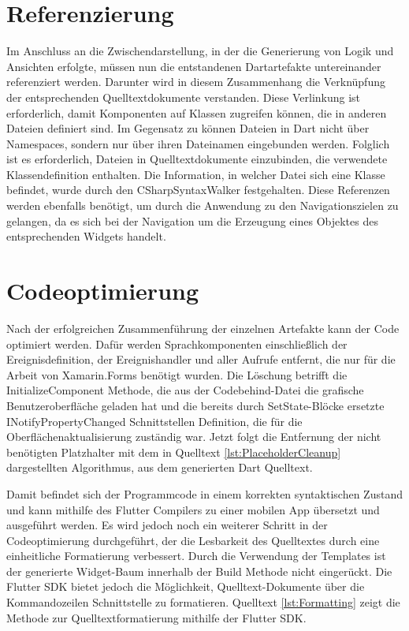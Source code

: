 \section{Referenzierung}
Im Anschluss an die Zwischendarstellung, in der die Generierung von Logik und Ansichten erfolgte,  müssen nun die entstandenen Dartartefakte untereinander referenziert werden.  Darunter wird in diesem Zusammenhang die Verknüpfung der entsprechenden Quelltextdokumente verstanden.  Diese Verlinkung ist erforderlich,  damit Komponenten auf Klassen zugreifen können,  die in anderen Dateien definiert sind.  Im Gegensatz zu \Csharp{} können Dateien in Dart nicht über Namespaces, sondern nur über ihren Dateinamen eingebunden werden.  Folglich ist es erforderlich,  Dateien in Quelltextdokumente einzubinden,  die verwendete Klassendefinition enthalten.  Die Information,  in welcher Datei sich eine Klasse befindet, wurde durch den \glq CSharpSyntaxWalker\grq{} festgehalten.  Diese Referenzen werden ebenfalls benötigt,  um durch die Anwendung zu den Navigationszielen zu gelangen, da es sich bei der Navigation um die Erzeugung eines Objektes des entsprechenden Widgets handelt. 


\section{Codeoptimierung}

Nach der erfolgreichen Zusammenführung der einzelnen Artefakte kann der Code optimiert werden. Dafür werden Sprachkomponenten einschließlich der Ereignisdefinition,  der Ereignishandler und aller Aufrufe entfernt, die  nur für die  Arbeit von Xamarin.Forms benötigt  wurden. Die Löschung betrifft die \glq InitializeComponent\grq{}  Methode, die aus der Codebehind-Datei die grafische Benutzeroberfläche geladen hat und die bereits durch SetState-Blöcke ersetzte
 \glq INotifyPropertyChanged\grq{}  Schnittstellen Definition,  die für die Oberflächenaktualisierung zuständig war.  Jetzt folgt die Entfernung der nicht benötigten Platzhalter mit dem in Quelltext \ref{lst:PlaceholderCleanup} dargestellten Algorithmus,  aus dem generierten Dart Quelltext.  

Damit befindet sich der Programmcode in einem korrekten syntaktischen Zustand und kann mithilfe des Flutter Compilers zu einer mobilen App übersetzt und ausgeführt werden.  Es wird jedoch noch ein weiterer Schritt in der Codeoptimierung durchgeführt,  der die Lesbarkeit des Quelltextes durch eine einheitliche Formatierung verbessert.  Durch die Verwendung der Templates ist der generierte  Widget-Baum innerhalb der Build Methode nicht eingerückt.  Die Flutter SDK bietet jedoch die Möglichkeit,  Quelltext-Dokumente über die Kommandozeilen Schnittstelle zu formatieren.  Quelltext \ref{lst:Formatting} zeigt die Methode zur Quelltextformatierung mithilfe der Flutter SDK. 

